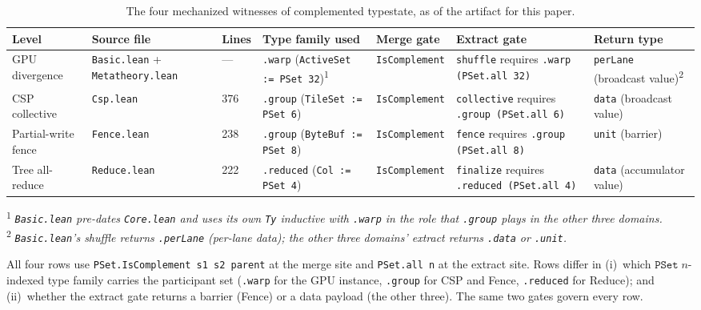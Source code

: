\documentclass[acmsmall,screen,review,anonymous,nonacm]{acmart}
\newcommand{\PSet}{\texttt{PSet}}
\newcommand{\IsComplement}{\texttt{IsComplement}}
\begin{document}
\begin{table}[t]
\caption{The four mechanized witnesses of complemented typestate, as of the artifact for this paper.}
\label{fig:witnesses}
\small
\begin{tabular}{@{}lllllll@{}}
\toprule
Level & Source file & Lines & Type family used & Merge gate & Extract gate & Return type \\
\midrule
GPU divergence & \texttt{Basic.lean} + \texttt{Metatheory.lean} & --- & \texttt{.warp} (\texttt{ActiveSet := PSet 32})\textsuperscript{1} & \IsComplement{} & \texttt{shuffle} requires \texttt{.warp (PSet.all 32)} & \texttt{perLane} (broadcast value)\textsuperscript{2} \\
CSP collective & \texttt{Csp.lean} & 376 & \texttt{.group} (\texttt{TileSet := PSet 6}) & \IsComplement{} & \texttt{collective} requires \texttt{.group (PSet.all 6)} & \texttt{data} (broadcast value) \\
Partial-write fence & \texttt{Fence.lean} & 238 & \texttt{.group} (\texttt{ByteBuf := PSet 8}) & \IsComplement{} & \texttt{fence} requires \texttt{.group (PSet.all 8)} & \texttt{unit} (barrier) \\
Tree all-reduce & \texttt{Reduce.lean} & 222 & \texttt{.reduced} (\texttt{Col := PSet 4}) & \IsComplement{} & \texttt{finalize} requires \texttt{.reduced (PSet.all 4)} & \texttt{data} (accumulator value) \\
\bottomrule
\end{tabular}

\medskip
\noindent\textsuperscript{1} \textit{\texttt{Basic.lean} pre-dates \texttt{Core.lean} and uses its own \texttt{Ty} inductive with \texttt{.warp} in the role that \texttt{.group} plays in the other three domains.}\\
\noindent\textsuperscript{2} \textit{\texttt{Basic.lean}'s shuffle returns \texttt{.perLane} (per-lane data); the other three domains' extract returns \texttt{.data} or \texttt{.unit}.}
\end{table}

All four rows use \texttt{PSet.IsComplement s1 s2 parent} at the merge site and \texttt{PSet.all n} at the extract site. Rows differ in (i)~which $\PSet\;n$-indexed type family carries the participant set (\texttt{.warp} for the GPU instance, \texttt{.group} for CSP and Fence, \texttt{.reduced} for Reduce); and (ii)~whether the extract gate returns a barrier (Fence) or a data payload (the other three). The same two gates govern every row.
\end{document}
